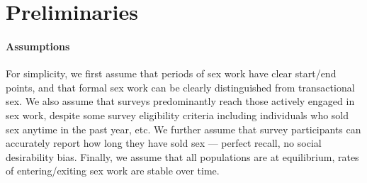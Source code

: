 \section{Preliminaries}\label{prelim}
\paragraph{Assumptions}
For simplicity, we first assume that
periods of sex work have clear start/end points,
and that formal sex work can be clearly distinguished from transactional sex.
We also assume that surveys predominantly reach those actively engaged in sex work,
despite some survey eligibility criteria including
individuals who sold sex anytime in the past year, etc.\cite{Scorgie2012}
We further assume that survey participants
can accurately report how long they have sold sex
--- \ie perfect recall, no social desirability bias.
Finally, we assume that all populations are at equilibrium,
\eg rates of entering/exiting sex work are stable over time.
